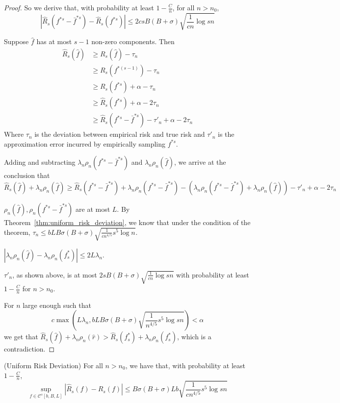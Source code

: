 \begin{proof}
So we derive that, with probability at least $1 -\frac{C}{n}$, for all $n > n_0$,
\[
|\hat{R}_s(f^{*s} - \bar{f}^{*s}) - \hat{R}_s(f^{*s})|\leq 2csB(B+\sigma) \sqrt{\frac{1}{cn} \log sn}
\]

Suppose $\hat{f}$ has at most $s-1$ non-zero components. Then
\begin{align*}
\hat{R}_s( \hat{f}) &\geq R_s(\hat{f}) - \tau_n \\
	&\geq R_s(f^{*(s-1)}) - \tau_n \\
	&\geq R_s(f^{*s}) + \alpha - \tau_n \\
	&\geq \hat{R}_s(f^{*s}) + \alpha - 2 \tau_n \\
	&\geq \hat{R}_s(f^{*s} - \bar{f}^{*s}) -\tau'_n + \alpha - 2\tau_n 
\end{align*}
Where $\tau_n$ is the deviation between empirical risk and true risk and $\tau'_n$ is the approximation error incurred by empirically sampling $f^{*s}$.

Adding and subtracting $ \lambda_n \rho_n(f^{*s} - \bar{f}^{*s})$ and $ \lambda_n \rho_n(\hat{f})$, we arrive at the conclusion that
\[
\hat{R}_s(\hat{f}) + \lambda_n \rho_n(\hat{f}) \geq \hat{R}_s(f^{*s} - \bar{f}^{*s}) + \lambda_n \rho_n(f^{*s} - \bar{f}^{*s}) - ( \lambda_n \rho_n(f^{*s} - \bar{f}^{*s}) + \lambda_n \rho_n(\hat{f}) ) -\tau'_n + \alpha - 2 \tau_n
\]

$\rho_n(\hat{f}), \rho_n(f^{*s} - \bar{f}^{*s})$ are at most $L$. By Theorem~\ref{thm:uniform_risk_deviation}, we know that under the condition of the theorem, $\tau_n \leq  bLB\sigma(B+\sigma)\sqrt{ \frac{1}{cn^{4/5}} s^5 \log n}$.

$|\lambda_n \rho_n(\hat{f}) - \lambda_n \rho_n(f^*_s)| \leq 2L \lambda_n$.

$\tau'_n$, as shown above, is at most $2sB(B+\sigma) \sqrt{\frac{1}{cn} \log sn}$ with probability at least $1-\frac{C}{n}$ for $n > n_0$.

For $n$ large enough such that
\[
c\max(L\lambda_n,  bLB\sigma(B+\sigma) \sqrt{ \frac{1}{n^{4/5}} s^5 \log sn}) < \alpha
\]
we get that $\hat{R}_s(\hat{f}) + \lambda_n \rho_n(\hat{r}) > \hat{R}_s(f^*_s) + \lambda_n \rho_n(f^*_s)$, which is a contradiction.

\end{proof}

%

\begin{theorem} (Uniform Risk Deviation)
\label{thm:uniform_risk_deviation}
For all $n > n_0$, we have that, with probability at least $1 - \frac{C}{n}$, 
\[
\sup_{f \in \mathcal{C}^s[b,B,L]} |\hat{R}_s(f) - R_s(f)| \leq B\sigma(B+\sigma)Lb\sqrt{ \frac{1}{cn^{4/5}} s^5 \log sn}
\]
\end{theorem}


